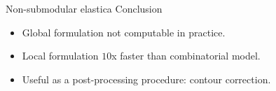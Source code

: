 \begin{frame}
{Non-submodular elastica}
{Conclusion}

\begin{itemize}
\item{Global formulation not computable in practice.}\\[1em]\pause
\item{Local formulation $10$x faster than combinatorial model.}\\[1em]\pause
\item{Useful as a post-processing procedure: contour correction. }
\end{itemize}
\end{frame}


